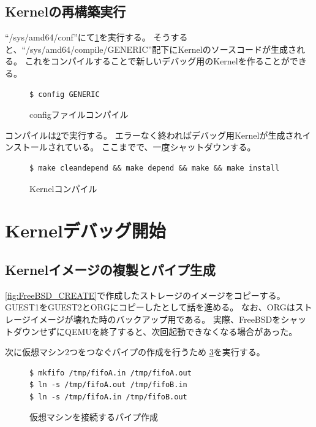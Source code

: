 \documentclass[a4j]{jarticle}
\begin{document}
\subsection{Kernelの再構築実行}
\label{sec:Kern_build}
``/sys/amd64/conf''にて\ref{fig:FreeBSD_cf}を実行する。
そうすると、``/sys/amd64/compile/GENERIC''配下にKernelのソースコードが生成される。
これをコンパイルすることで新しいデバッグ用のKernelを作ることができる。
\begin{figure}[htbp]
	\begin{center}
		\begin{lstlisting}[basicstyle=\ttfamily\footnotesize, frame=single, breaklines=true]
$ config GENERIC
		\end{lstlisting}
	\end{center}
	\caption{configファイルコンパイル}
	\label{fig:FreeBSD_cf}
\end{figure}

コンパイルは\ref{fig:FreeBSD_kern}で実行する。
エラーなく終わればデバッグ用Kernelが生成されインストールされている。
ここまでで、一度シャットダウンする。
\begin{figure}[htbp]
	\begin{center}
		\begin{lstlisting}[basicstyle=\ttfamily\footnotesize, frame=single, breaklines=true]
$ make cleandepend && make depend && make && make install
		\end{lstlisting}
	\end{center}
	\caption{Kernelコンパイル}
	\label{fig:FreeBSD_kern}
\end{figure}

\section{Kernelデバッグ開始}
\subsection{Kernelイメージの複製とパイプ生成}
\ref{fig:FreeBSD_CREATE}で作成したストレージのイメージをコピーする。
GUEST1をGUEST2とORGにコピーしたとして話を進める。
なお、ORGはストレージイメージが壊れた時のバックアップ用である。
実際、FreeBSDをシャットダウンせずにQEMUを終了すると、次回起動できなくなる場合があった。

次に仮想マシン2つをつなぐパイプの作成を行うため
\ref{fig:FreeBSD_pipe}を実行する。
\begin{figure}[htbp]
	\begin{center}
		\begin{lstlisting}[basicstyle=\ttfamily\footnotesize, frame=single, breaklines=true]
$ mkfifo /tmp/fifoA.in /tmp/fifoA.out
$ ln -s /tmp/fifoA.out /tmp/fifoB.in
$ ln -s /tmp/fifoA.in /tmp/fifoB.out
		\end{lstlisting}
	\end{center}
	\caption{仮想マシンを接続するパイプ作成}
	\label{fig:FreeBSD_pipe}
\end{figure}
\end{document}
